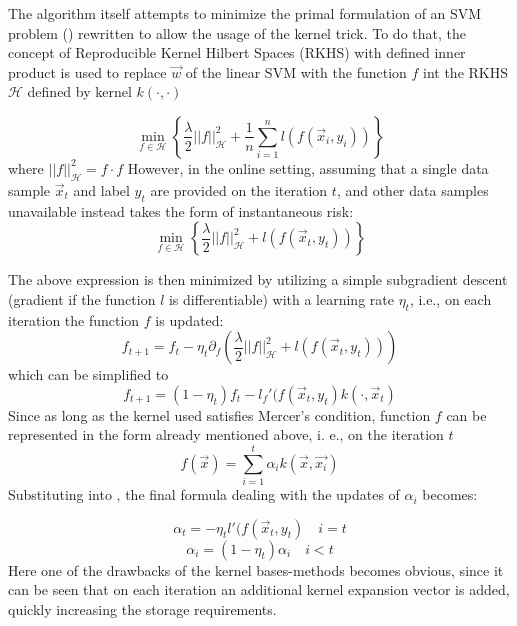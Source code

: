 The algorithm itself attempts to minimize the primal formulation of an SVM problem () rewritten to allow the usage of the kernel trick. To do that, the concept of Reproducible Kernel Hilbert Spaces (RKHS) with defined inner product is used to replace $\vec{w}$ of the linear SVM with the function $f$ int the RKHS $\mathscr{H}$  defined by kernel $k(\cdot,\cdot)$

\begin{equation}
\label{kernelPrimal}
 \min_{f \in \mathscr{H}} \left\{ \frac{\lambda}{2}||f||_\mathscr{H} ^2 +\frac{1}{n}\sum_{i=1}^{n}l(f(\vec{x}_i,y_i))\right\}
\end{equation}
where $||f||_\mathscr{H} ^2=f\cdot f$
However, in the online setting, assuming that a single data sample $\vec{x}_t$ and label $y_t$ are provided on the iteration $t$, and other data samples unavailable  instead takes the form of instantaneous risk: 
\begin{equation}
\label{kernelPrimalInst}
 \min_{f \in \mathscr{H}} \left\{ \frac{\lambda}{2}||f||_\mathscr{H} ^2 +l(f(\vec{x}_t,y_t))\right\}
\end{equation}

The above expression is then minimized by utilizing a simple subgradient descent (gradient if the function $l$ is differentiable) with a learning rate $\eta_t$, i.e., on each iteration the function $f$ is updated:
\begin{equation*}
f_{t+1}=f_t-\eta_{t} \partial_f \left( \frac{\lambda}{2}||f||_\mathscr{H} ^2 +l(f(\vec{x}_t,y_t))\right) 
\end{equation*}
which can be simplified to
\begin{equation}
\label{NORMAUpdate}
f_{t+1}=(1-\eta_{t})f_t-l_f'(f(\vec{x}_t,y_t)k(\cdot,\vec{x}_t)
\end{equation}
Since as long as the kernel used satisfies Mercer's condition, function $f$ can be represented in the form already mentioned above, i. e., on the iteration $t$
\begin{equation}
\label{Fexpansion}
f(\vec{x})=\sum_{i=1}^{t}\alpha_i k(\vec{x},\vec{x_i})
\end{equation}
Substituting  into  , the final formula dealing with the updates of $\alpha_i$ becomes:

$$
\alpha_t=-\eta_{t}l'(f(\vec{x}_t,y_t) \quad {i=t}
$$
$$
\alpha_i=(1-\eta_{t})\alpha_i \quad {i<t}
$$
Here one of the drawbacks of the kernel bases-methods becomes obvious, since it can be seen that on each iteration an additional kernel expansion vector is added, quickly increasing the storage requirements.

